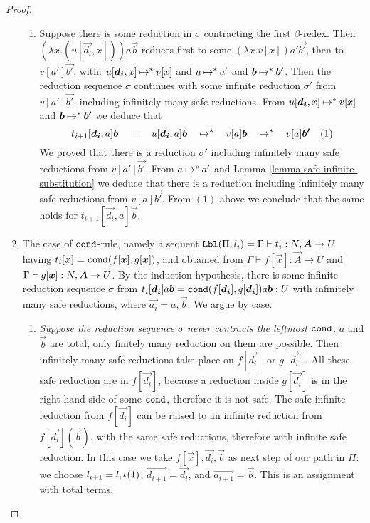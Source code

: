 \begin{proof}
\begin{enumerate}
\begin{enumerate}
\item
 Suppose there is some reduction in $\sigma$ contracting the first $\beta$-redex.
 Then  $(\lambda x.(u[\vec{d_i},x]))a\vec{b}$ reduces first to some
 $ (\lambda x.v[x])a'\vec{b'}$, then to $v[a']\vec{b'}$, with: 
 $u[\vec{d_i},x] \reduces^{*} v[x]$ and $a\mathbin{\mapsto}^{*} a'$ and $\vec{b} \reduces^{*} \vec{b'}$.
 Then the reduction sequence $\sigma$ continues 
  with some infinite reduction $\sigma'$ from $v[a']\vec{b'}$, including infinitely many safe reductions. 
 From $u[\vec{d_i},x] \reduces^{*} v[x]$ and $\vec{b} \reduces^{*} \vec{b'}$ we deduce that 
 \[
 t_{i+1}[\vec{d_i},a]\vec{b}  
 \quad =\quad
 u[\vec{d_i},a]\vec{b} 
 \quad\reduces^{*}\quad
 v[a]\vec{b}
 \quad\reduces^{*}\quad
 v[a]\vec{b'} 
 \ \ \ \mbox{(1)}
 \]
 We proved that there is a reduction $\sigma'$ including infinitely many safe reductions from  $v[a']\vec{b'}$.
 From $a \mathbin{\mapsto}^{*} a'$ and Lemma \ref{lemma-safe-infinite-substitution} 
 we deduce that there is a reduction including infinitely many safe reductions from  $v[a]\vec{b'}$.
 From $(1)$ above we conclude that the same holds for
   $t_{i+1}[\vec{d_i},a]\vec{b}$.
\end{enumerate}



\item
  The case of ${\tt cond}$-rule, namely a sequent
  $\Label(\Pi,l_i) = \Gamma\vdash t_i:\N,\vec{A}\rightarrow U$
  having $t_i[\vec{x}] = \cond(f[\vec{x}],g[\vec{x}])$,
  and obtained from 
  $\Gamma\vdash f[\vec{x}]:\vec{A}\rightarrow U$
  and
  $\Gamma\vdash g[\vec{x}]:\N,\vec{A}\rightarrow U$. 
  By the induction hypothesis, there is some infinite reduction sequence $\sigma$ from
  $t_i[\vec{d_i}]a \vec{b} = \cond(f[\vec{d_i}],g[\vec{d_i}])a\vec{b}: U$
  with infinitely many safe reductions,
  where $\vec{a_i} = a,\vec{b}$. 
  We argue by case.

\begin{enumerate}
\item
  \emph{Suppose the reduction sequence $\sigma$ never contracts the leftmost ${\tt cond}$.}
  $a$ and $\vec{b}$ are total, only finitely many reduction on them are possible.
  Then infinitely many safe reductions take place on $f[\vec{d_i}]$ or $g[\vec{d_i}]$. 
  All these safe reduction are in $f[\vec{d_i}]$, because
  a reduction inside $g[\vec{d_i}]$ is in the right-hand-side of some ${\tt cond}$, therefore it is not safe.
  The safe-infinite reduction from $f[\vec{d_i}]$ can be raised to an infinite reduction from 
  $f[\vec{d_i}](\vec{b})$, with the same safe reductions, therefore with infinite safe reduction.
  In this case we take $f[\vec{x}],\vec{d_i},\vec{b}$ as next step of our path in $\Pi$:
  we choose $l_{i+1} = l_i {\star} (1)$, $\vec{d_{i+1}} = \vec{d_i}$, and
  $\vec{a_{i+1}} = \vec{b}$.  This is an assignment with total terms.


\end{enumerate}
\end{enumerate}
\end{proof}
